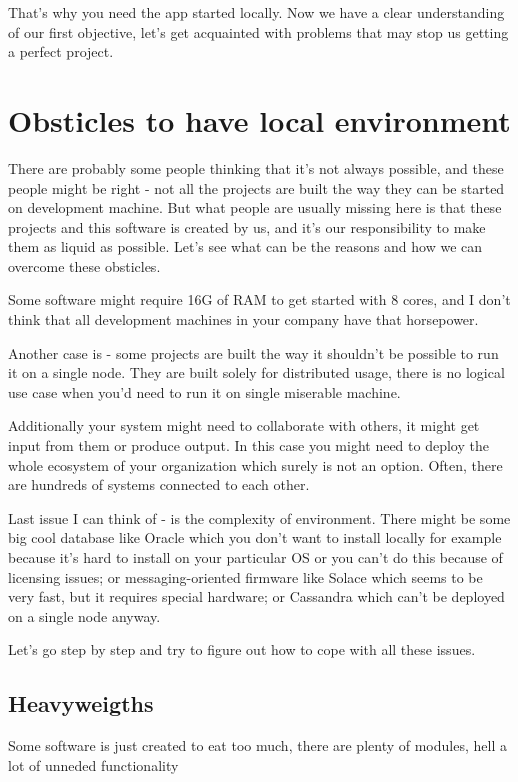 \documentclass[11pt,a4paper,oneside]{article}
\begin{document}
That's why you need the app started locally. Now we have a clear understanding of our first objective, let's get acquainted with problems that may stop us getting a perfect project.

\section{Obsticles to have local environment}

There are probably some people thinking that it's not always possible, and these people might be right - not all the projects are built the way they can be started on development machine. But what people are usually missing here is that these projects and this software is created by us, and it's our responsibility to make them as liquid as possible. Let's see what can be the reasons and how we can overcome these obsticles.

Some software might require 16G of RAM to get started with 8 cores, and I don't think that all development machines in your company have that horsepower. 

Another case is - some projects are built the way it shouldn't be possible to run it on a single node. They are built solely for distributed usage, there is no logical use case when you'd need to run it on single miserable machine.

Additionally your system might need to collaborate with others, it might get input from them or produce output. In this case you might need to deploy the whole ecosystem of your organization which surely is not an option. Often, there are hundreds of systems connected to each other.

Last issue I can think of - is the complexity of environment. There might be some big cool database like Oracle which you don't want to install locally for example because it's hard to install on your particular OS or you can't do this because of licensing issues; or messaging-oriented firmware like Solace which seems to be very fast, but it requires special hardware; or Cassandra which can't be deployed on a single node anyway. 

Let's go step by step and try to figure out how to cope with all these issues.
\subsection{Heavyweigths}
Some software is just created to eat too much, there are plenty of modules, hell a lot of unneded functionality 
\end{document}
